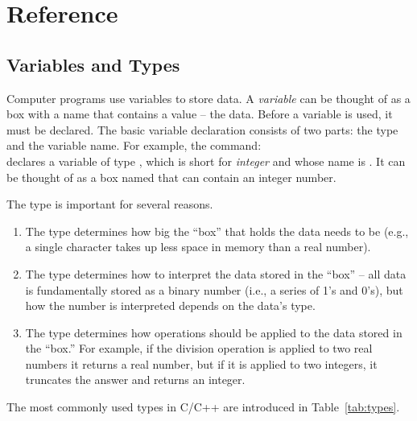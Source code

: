 \chapter{Reference}

\section{Variables and Types}\label{appendix:types}

Computer programs use variables to store data.  A \emph{variable} can be thought of as a box with a name that contains a value -- the data.  Before a variable is used, it must be declared.  The basic variable declaration consists of two parts: the type and the variable name.  For example, the command:\\
declares a variable of type , which is short for \emph{integer} and whose name is .  It can be thought of as a box named  that can contain an integer number.  

The type is important for several reasons.  
\begin{enumerate}
\item The type determines how big the ``box'' that holds the data needs to be (e.g., a single character takes up less space in memory than a real number).   
\item The type determines how to interpret the data stored in the ``box'' -- all data is fundamentally stored as a binary number (i.e., a series of 1's and 0's), but how the number is interpreted depends on the data's type.  
\item The type determines how operations should be applied to the data stored in the ``box.''  For example, if the division operation is applied to two real numbers it returns a real number, but if it is applied to two integers, it truncates the answer and returns an integer.
\end{enumerate}

The most commonly used types in C/C++ are introduced in Table~\ref{tab:types}.

